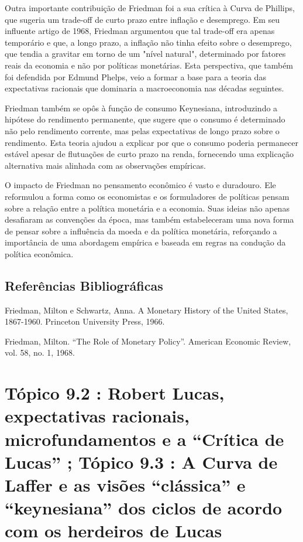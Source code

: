 \documentclass[a4paper,12pt]{article}[abntex2]
\begin{document}
Outra importante contribuição de Friedman foi a sua crítica à Curva de Phillips, que sugeria um trade-off de curto prazo entre inflação e desemprego. Em seu influente artigo de 1968, Friedman argumentou que tal trade-off era apenas temporário e que, a longo prazo, a inflação não tinha efeito sobre o desemprego, que tendia a gravitar em torno de um "nível natural", determinado por fatores reais da economia e não por políticas monetárias. Esta perspectiva, que também foi defendida por Edmund Phelps, veio a formar a base para a teoria das expectativas racionais que dominaria a macroeconomia nas décadas seguintes.

Friedman também se opôs à função de consumo Keynesiana, introduzindo a hipótese do rendimento permanente, que sugere que o consumo é determinado não pelo rendimento corrente, mas pelas expectativas de longo prazo sobre o rendimento. Esta teoria ajudou a explicar por que o consumo poderia permanecer estável apesar de flutuações de curto prazo na renda, fornecendo uma explicação alternativa mais alinhada com as observações empíricas.

O impacto de Friedman no pensamento econômico é vasto e duradouro. Ele reformulou a forma como os economistas e os formuladores de políticas pensam sobre a relação entre a política monetária e a economia. Suas ideias não apenas desafiaram as convenções da época, mas também estabeleceram uma nova forma de pensar sobre a influência da moeda e da política monetária, reforçando a importância de uma abordagem empírica e baseada em regras na condução da política econômica.

\subsection{\textbf{Referências Bibliográficas}}
Friedman, Milton e Schwartz, Anna. A Monetary History of the United States, 1867-1960.
Princeton University Press, 1966.

Friedman, Milton. “The Role of Monetary Policy”. American Economic Review, vol. 58, no. 1,
1968.

\newpage
\section{\textbf{Tópico 9.2 : Robert Lucas, expectativas racionais, microfundamentos e a “Crítica de Lucas” ; Tópico 9.3 : A Curva de Laffer e as visões “clássica” e “keynesiana” dos ciclos de acordo com os herdeiros de Lucas}}
\end{document}
